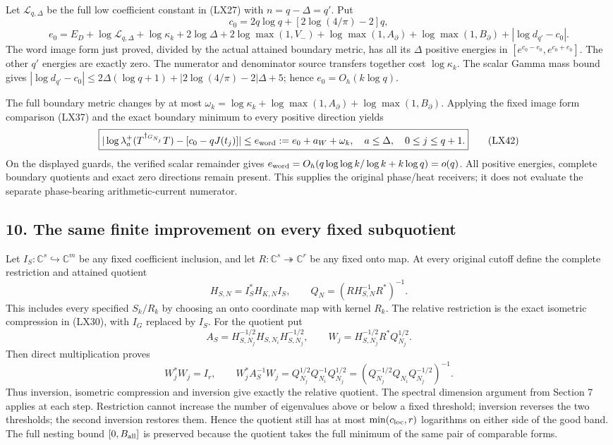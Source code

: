 \documentclass[10pt]{article}
\begin{document}
Let \(\mathcal L_{q,\Delta}\) be the full low coefficient constant in (LX27) with \(n=q-\Delta=q'\). Put \[
c_0=2q\log q+[2\log(4/\pi)-2]q,
\] \[
e_0=E_D+\log\mathcal L_{q,\Delta}+\log\kappa_k+2\log\Delta
+2\log\max(1,V_-)+\log\max(1,A_\partial)+\log\max(1,B_\partial)
+|\log d_{q'}-c_0|.
\tag{LX41}
\] The word image form just proved, divided by the actual attained boundary metric, has all its \(\Delta\) positive energies in \([e^{c_0-e_0},e^{c_0+e_0}]\). The other \(q'\) energies are exactly zero. The numerator and denominator source transfers together cost \(\log\kappa_k\). The scalar Gamma mass bound gives \(|\log d_{q'}-c_0|\le2\Delta(\log q+1)+|2\log(4/\pi)-2|\Delta+5\); hence \(e_0=O_h(k\log q)\).

The full boundary metric changes by at most \(\omega_k=\log\kappa_k+\log\max(1,A_\partial)+\log\max(1,B_\partial)\). Applying the fixed image form comparison (LX37) and the exact boundary minimum to every positive direction yields \[
\boxed{|\log\lambda_a^+(T^{\dagger_{G_{N_j}}}T)-[c_0-qJ(t_j)]|
\le e_{\rm word}:=e_0+a_W+\omega_k,
\quad a\le\Delta,\quad0\le j\le q+1.}
\tag{LX42}
\] On the displayed guards, the verified scalar remainder gives \(e_{\rm word}=O_h(q\log\log k/\log k+k\log q)=o(q)\). All positive energies, complete boundary quotients and exact zero directions remain present. This supplies the original phase/heat receivers; it does not evaluate the separate phase-bearing arithmetic-current numerator.

\subsection{10. The same finite improvement on every fixed subquotient}\label{the-same-finite-improvement-on-every-fixed-subquotient}

Let \(I_S:\mathbb C^s\hookrightarrow\mathbb C^m\) be any fixed coefficient inclusion, and let \(R:\mathbb C^s\twoheadrightarrow\mathbb C^r\) be any fixed onto map. At every original cutoff define the complete restriction and attained quotient \[
H_{S,N}=I_S^*H_{K,N}I_S,\qquad
Q_N=(RH_{S,N}^{-1}R^*)^{-1}.
\] This includes every specified \(S_k/R_k\) by choosing an onto coordinate map with kernel \(R_k\). The relative restriction is the exact isometric compression in (LX30), with \(I_G\) replaced by \(I_S\). For the quotient put \[
A_S=H_{S,N_j}^{-1/2}H_{S,N_i}H_{S,N_j}^{-1/2},\qquad
W_j=H_{S,N_j}^{-1/2}R^*Q_{N_j}^{1/2}.
\] Then direct multiplication proves \[
W_j^*W_j=I_r,\qquad
W_j^*A_S^{-1}W_j
=Q_{N_j}^{1/2}Q_{N_i}^{-1}Q_{N_j}^{1/2}
=(Q_{N_j}^{-1/2}Q_{N_i}Q_{N_j}^{-1/2})^{-1}.
\tag{LX43}
\] Thus inversion, isometric compression and inversion give exactly the relative quotient. The spectral dimension argument from Section 7 applies at each step. Restriction cannot increase the number of eigenvalues above or below a fixed threshold; inversion reverses the two thresholds; the second inversion restores them. Hence the quotient still has at most \(\min(c_{\rm loc},r)\) logarithms on either side of the good band. The full nesting bound \([0,B_{\rm all}]\) is preserved because the quotient takes the full minimum of the same pair of comparable forms.
\end{document}
